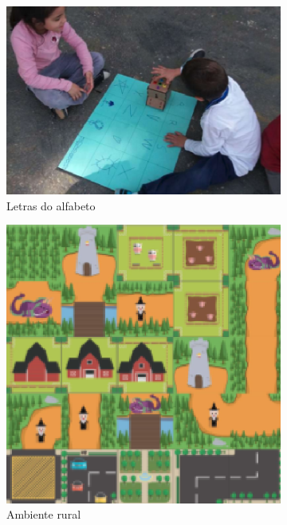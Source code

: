 \begin{figure}[!htbp]
    \centering
    \begin{subfigure}{.33\textwidth}
        \centering
        \includegraphics[width=.9\linewidth,fbox]{figs/tapete_alfabeto.png}
        \caption{Letras do alfabeto}
        \label{tapete_alfabeto}
    \end{subfigure}%
    \begin{subfigure}{.33\textwidth}
        \centering
        \includegraphics[width=.9\linewidth,fbox]{figs/tapete_farm.png}
        \caption{Ambiente rural}
        \label{tapete_farm}
    \end{subfigure}
    \begin{subfigure}{.33\textwidth}

\end{subfigure}
\end{figure}
